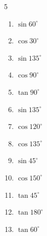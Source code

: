 \begin{multicols}{5}
\begin{enumerate}
  \item $\displaystyle \sin{60^\circ}$


  \item $\displaystyle \cos{30^\circ}$


  \item $\displaystyle \sin{135^\circ}$


  \item $\displaystyle \cos{90^\circ}$

        \phantom{$\displaystyle =0$}

  \item $\displaystyle \tan{90^\circ}$

        \phantom{$\displaystyle なし$}

  \item $\displaystyle \sin{135^\circ}$


\columnbreak %

  \item $\displaystyle \cos{120^\circ}$


  \item $\displaystyle \cos{135^\circ}$


  \item $\displaystyle \sin{45^\circ}$


  \item $\displaystyle \cos{150^\circ}$


  \item $\displaystyle \tan{45^\circ}$

        \phantom{$\displaystyle =1$}

  \item $\displaystyle \tan{180^\circ}$

        \phantom{$\displaystyle =0$}

  \item $\displaystyle \tan{60^\circ}$


\end{enumerate}
\end{multicols}
